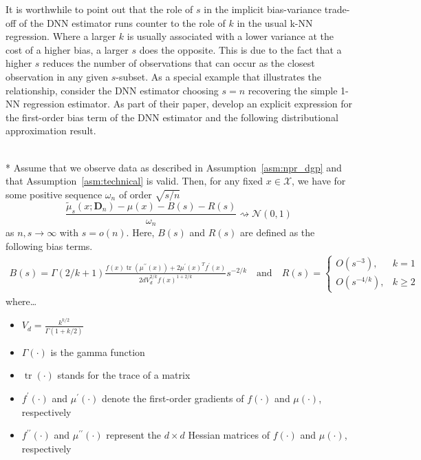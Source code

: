 It is worthwhile to point out that the role of $s$ in the implicit bias-variance trade-off of the DNN estimator runs counter to the role of $k$ in the usual k-NN regression.
Where a larger $k$ is usually associated with a lower variance at the cost of a higher bias, a larger $s$ does the opposite.
This is due to the fact that a higher $s$ reduces the number of observations that can occur as the closest observation in any given $s$-subset.
As a special example that illustrates the relationship, consider the DNN estimator choosing $s = n$ recovering the simple 1-NN regression estimator.
As part of their paper, \citet{demirkaya_optimal_2024} develop an explicit expression for the first-order bias term of the DNN estimator and the following distributional approximation result.
\begin{boxD}
	\begin{thm}\label{thm:dem2}\mbox{}\\*
		Assume that we observe data as described in Assumption~\ref{asm:npr_dgp} and that Assumption~\ref{asm:technical} is valid.
		Then, for any fixed $x \in \mathcal{X}$, we have for some positive sequence $\omega_n$ of order $\sqrt{s/n}$
		\begin{equation}
			\frac{\tilde{\mu}_{s}(x; \mathbf{D}_n) - \mu(x) - B(s) - R(s)}{\omega_n}
			\rightsquigarrow \mathcal{N}\left(0,1\right)
		\end{equation}
		as $n,s \rightarrow \infty$ with $s = o(n)$.
		Here, $B(s)$ and $R(s)$ are defined as the following bias terms.
		\begin{align}
			B(s)
			= \Gamma(2 / k+1) \frac{f(x) \operatorname{tr}\left(\mu^{\prime \prime}(x)\right)+2 \mu^{\prime}(x)^T f^{\prime}(x)}{2 d V_d^{2 / k} f(x)^{1+2 / k}} s^{-2 / k}
			\quad \text{and} \quad
			R(s) =
			\begin{cases}
				O\left(s^{-3}\right),     & k = 1      \\
				O\left(s^{-4 / k}\right), & k \geq 2
			\end{cases}
		\end{align}
		where\dots
		\begin{multicols}{2}
			\begin{itemize}
				\item $V_d=\frac{k^{k / 2}}{\Gamma(1+k / 2)}$
				\item $\Gamma(\cdot)$ is the gamma function
				\item $\operatorname{tr}(\cdot)$ stands for the trace of a matrix
				\item $f^{\prime}(\cdot)$ and $\mu^{\prime}(\cdot)$ denote the first-order gradients of $f(\cdot)$ and $\mu(\cdot)$, respectively
				\item $f^{\prime \prime}(\cdot)$ and $\mu^{\prime \prime}(\cdot)$ represent the $d \times d$ Hessian matrices of $f(\cdot)$ and $\mu(\cdot)$, respectively
			\end{itemize}
		\end{multicols}
	\end{thm}
\end{boxD}

